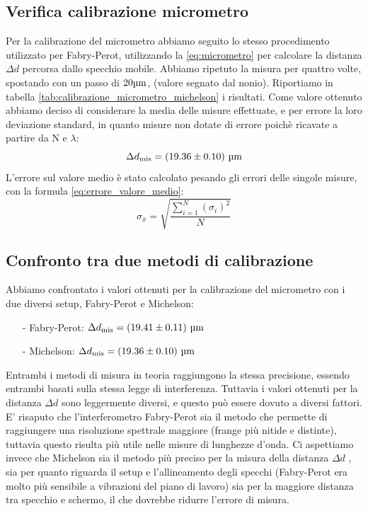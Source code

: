 \documentclass[letterpaper,12pt]{article}
\begin{document}
\subsection{Verifica calibrazione micrometro}
Per la calibrazione del micrometro abbiamo seguito lo stesso procedimento utilizzato per Fabry-Perot, 
utilizzando la  \eqref{eq:micrometro} per calcolare la distanza $\Delta d$ percorsa dallo specchio mobile. Abbiamo ripetuto
la misura per quattro volte, spostando con un passo di $20 \text{\SIUnitSymbolMicro m}$, (valore segnato 
dal nonio). Riportiamo in tabella \ref{tab:calibrazione_micrometro_michelson} i risultati. Come valore ottenuto
abbiamo deciso di considerare la media delle misure effettuate, e per errore la loro deviazione standard, in quanto 
misure non dotate di errore poichè ricavate a partire da N e $\lambda$:
$$\Delta d_\text{mis} = (19.36 \pm0.10)\ \text{\SIUnitSymbolMicro m} $$
L'errore sul valore medio è stato calcolato pesando 
gli errori delle singole misure, con la formula \eqref{eq:errore_valore_medio}:
\begin{equation}
    \sigma_{\bar{x}} = \sqrt{\frac{\sum_{i=1}^{N} (\sigma_i)^2}{N}}
    \label{eq:errore_valore_medio}
\end{equation}


\subsection{Confronto tra due metodi di calibrazione}

Abbiamo confrontato i valori ottenuti per la calibrazione del micrometro con i due diversi setup, Fabry-Perot e Michelson:
\begin{itemize}
    \item[-] Fabry-Perot: $\Delta d_\text{mis} = (19.41 \pm0.11)\ \text{\SIUnitSymbolMicro m} $
    \item[-] Michelson: $\Delta d_\text{mis} = (19.36 \pm0.10)\ \text{\SIUnitSymbolMicro m} $
\end{itemize}

Entrambi i metodi di misura in teoria raggiungono la stessa precisione, essendo entrambi basati sulla stessa legge di interferenza.
Tuttavia i valori ottenuti per la distanza $\Delta d$ sono leggermente diversi, e questo può essere dovuto a diversi fattori.
E' risaputo che l'interferometro Fabry-Perot sia il metodo che permette di raggiungere una risoluzione spettrale maggiore (frange più nitide e distinte), tuttavia questo risulta più utile nelle misure di lunghezze d'onda.
Ci aspettiamo invece che Michelson sia il metodo più preciso per la misura della distanza $\Delta d$ , sia per quanto riguarda il setup e l'allineamento degli specchi (Fabry-Perot era molto più sensibile a vibrazioni del piano di lavoro)
sia per la maggiore distanza tra specchio e schermo, il che dovrebbe ridurre l'errore di misura.\\
\end{document}

